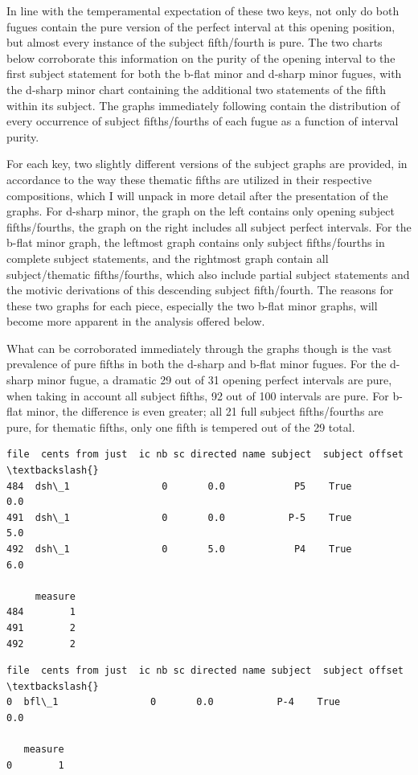In line with the temperamental expectation of these two keys, not only
do both fugues contain the pure version of the perfect interval at this
opening position, but almost every instance of the subject fifth/fourth
is pure. The two charts below corroborate this information on the purity
of the opening interval to the first subject statement for both the
b-flat minor and d-sharp minor fugues, with the d-sharp minor chart
containing the additional two statements of the fifth within its
subject. The graphs immediately following contain the distribution of
every occurrence of subject fifths/fourths of each fugue as a function
of interval purity.

For each key, two slightly different versions of the subject graphs are
provided, in accordance to the way these thematic fifths are utilized in
their respective compositions, which I will unpack in more detail after
the presentation of the graphs. For d-sharp minor, the graph on the left
contains only opening subject fifths/fourths, the graph on the right
includes all subject perfect intervals. For the b-flat minor graph, the
leftmost graph contains only subject fifths/fourths in complete subject
statements, and the rightmost graph contain all subject/thematic
fifths/fourths, which also include partial subject statements and the
motivic derivations of this descending subject fifth/fourth. The reasons
for these two graphs for each piece, especially the two b-flat minor
graphs, will become more apparent in the analysis offered below.

What can be corroborated immediately through the graphs though is the
vast prevalence of pure fifths in both the d-sharp and b-flat minor
fugues. For the d-sharp minor fugue, a dramatic 29 out of 31 opening
perfect intervals are pure, when taking in account all subject fifths,
92 out of 100 intervals are pure. For b-flat minor, the difference is
even greater; all 21 full subject fifths/fourths are pure, for thematic
fifths, only one fifth is tempered out of the 29 total.

\begin{Verbatim}[commandchars=\\\{\}]
      file  cents from just  ic nb sc directed name subject  subject offset  \textbackslash{}
484  dsh\_1                0       0.0            P5    True             0.0   
491  dsh\_1                0       0.0           P-5    True             5.0   
492  dsh\_1                0       5.0            P4    True             6.0   

     measure  
484        1  
491        2  
492        2  
\end{Verbatim}
\begin{Verbatim}[commandchars=\\\{\}]
    file  cents from just  ic nb sc directed name subject  subject offset  \textbackslash{}
0  bfl\_1                0       0.0           P-4    True             0.0   

   measure  
0        1  
\end{Verbatim}

